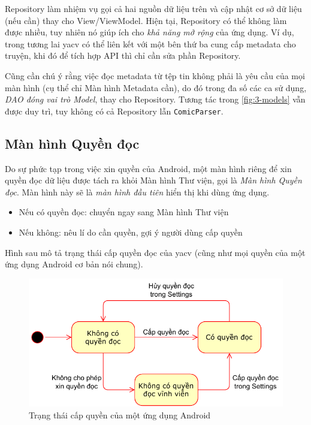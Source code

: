 \documentclass[../../../../thesis]{subfiles}
\begin{document}
Repository làm nhiệm vụ gọi cả hai nguồn dữ liệu trên và cập nhật cơ sở dữ liệu
(nếu cần) thay cho View/ViewModel. Hiện tại, Repository có thể không làm được
nhiều, tuy nhiên nó giúp ích cho \emph{khả năng mở rộng} của ứng dụng. Ví dụ,
trong tương lai yacv có thể liên kết với một bên thứ ba cung cấp metadata cho
truyện, khi đó để tích hợp API thì chỉ cần sửa phần Repository.

Cũng cần chú ý rằng việc đọc metadata từ tệp tin không phải là yêu cầu của mọi
màn hình (cụ thể chỉ Màn hình Metadata cần), do đó trong đa số các ca sử dụng,
\emph{DAO đóng vai trò Model}, thay cho Repository. Tương tác trong
\autoref{fig:3-models} vẫn được duy trì, tuy không có cả Repository lẫn
\texttt{ComicParser}.



\subsection{Màn hình Quyền đọc}\label{sec:permission-design}

Do sự phức tạp trong việc xin quyền của Android, một màn hình riêng để xin quyền
đọc dữ liệu được tách ra khỏi Màn hình Thư viện, gọi là \emph{Màn hình Quyền
đọc}. Màn hình này sẽ là \emph{màn hình đầu tiên} hiển thị khi dùng ứng dụng.

\begin{itemize}
    \item
        Nếu có quyền đọc: chuyển ngay sang Màn hình Thư viện
    \item
        Nếu không: nêu lí do cần quyền, gợi ý người dùng cấp quyền
\end{itemize}

Hình sau mô tả trạng thái cấp quyền đọc của yacv (cũng như mọi quyền của một ứng
dụng Android cơ bản nói chung).

\begin{figure}[H]
    \centering
    \includegraphics[scale=0.8]{../images/read_permission_state.pdf}
    \caption{Trạng thái cấp quyền của một ứng dụng Android}
    \label{fig:permission-states}
\end{figure}
\end{document}

